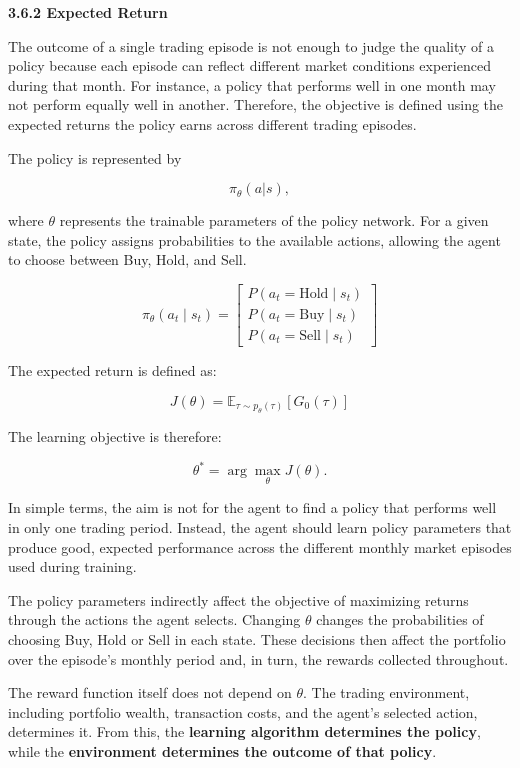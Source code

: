 \textbf{3.6.2 Expected Return}

The outcome of a single trading episode is not enough to judge the
quality of a policy because each episode can reflect different market
conditions experienced during that month. For instance, a policy that
performs well in one month may not perform equally well in another.
Therefore, the objective is defined using the expected returns the
policy earns across different trading episodes.

The policy is represented by

\[\pi_{\theta}\left( a|s \right),\]

where \(\theta\) represents the trainable parameters of the policy
network. For a given state, the policy assigns probabilities to the
available actions, allowing the agent to choose between Buy, Hold, and
Sell.

\[\pi_{\theta}\left( a_{t} \mid s_{t} \right) = \begin{bmatrix}
P\left( a_{t} = \text{Hold} \mid s_{t} \right) \\
P\left( a_{t} = \text{Buy} \mid s_{t} \right) \\
P\left( a_{t} = \text{Sell} \mid s_{t} \right)
\end{bmatrix}\]

The expected return is defined as:

\[J(\theta) = \mathbb{E}_{\tau \sim p_{\theta}(\tau)}\left\lbrack G_{0}(\tau) \right\rbrack\]

The learning objective is therefore:

\[\theta^{*} = \arg{\max_{\theta}{J(\theta)}}.\]

In simple terms, the aim is not for the agent to find a policy that
performs well in only one trading period. Instead, the agent should
learn policy parameters that produce good, expected performance across
the different monthly market episodes used during training.

The policy parameters indirectly affect the objective of maximizing
returns through the actions the agent selects. Changing \(\theta\)
changes the probabilities of choosing Buy, Hold or Sell in each state.
These decisions then affect the portfolio over the episode's monthly
period and, in turn, the rewards collected throughout.

The reward function itself does not depend on \(\theta\). The trading
environment, including portfolio wealth, transaction costs, and the
agent's selected action, determines it. From this, the \textbf{learning
algorithm determines the policy}, while the \textbf{environment
determines the outcome of that policy}.


